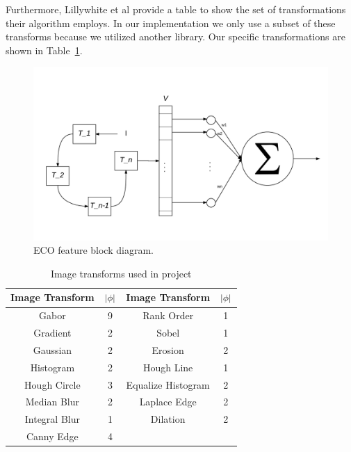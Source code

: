 \documentclass[conference]{IEEEtran}
\DeclarePairedDelimiter\abs{\lvert}{\rvert}
\begin{document}
Furthermore, Lillywhite et al provide a table to show the set of transformations their algorithm employs. In our implementation we only use a subset of these transforms because we utilized another library. Our specific transformations are shown in Table~\ref{tab:transforms}. 
\begin{figure}[t]
\centering
\includegraphics[width=\columnwidth]{eco-feature.png}
\caption{ECO feature block diagram.}
\label{fig:eco-feat}
\end{figure}
\begin{table}[b]
  \centering
  \begin{tabular}{c c c c}
    \hline
    Image Transform & $\abs{\phi}$ & Image Transform & $\abs{\phi}$\\
    \hline
    Gabor & 9 & Rank Order & 1\\
    Gradient & 2 & Sobel & 1\\
    Gaussian & 2 & Erosion & 2\\
    Histogram & 2 & Hough Line & 1\\
    Hough Circle & 3 & Equalize Histogram & 2\\
    Median Blur & 2 & Laplace Edge & 2\\
    Integral Blur & 1 & Dilation & 2\\
    Canny Edge & 4\\
    \hline
  \end{tabular}
  \caption{Image transforms used in project}
  \label{tab:transforms}
\end{table}
\end{document}
